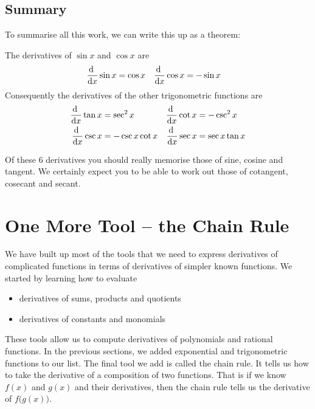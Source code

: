 \goodbreak
\subsection*{Summary}
To summarise all this work, we can write this up as a theorem:
\begin{theorem}\label{thm:DIFFtrigDerivs}
 The derivatives of $\sin x$ and $\cos x$ are
\begin{align*}
  \diff{}{x} \sin x &= \cos x & \diff{}{x} \cos x &= - \sin x
\end{align*}
Consequently the derivatives of the other trigonometric functions are
\begin{align*}
  \diff{}{x} \tan x &= \sec^2 x &
  \diff{}{x} \cot x &= -\csc^2 x \\
  \diff{}{x} \csc x &= -\csc x \cot x &
  \diff{}{x} \sec x &= \sec x \tan x
\end{align*}
\end{theorem}
Of these 6 derivatives you should really memorise those of sine, cosine and tangent. We
certainly expect you to be able to work out those of cotangent, cosecant and secant.


\section{One More Tool  -- the Chain Rule}\label{sec chain rule}

We have built up most of the tools that we need to express derivatives of
complicated functions in terms of derivatives of simpler known functions.
We started by learning how to evaluate
\begin{itemize}
 \item derivatives of sums, products and quotients
 \item derivatives of constants and monomials
\end{itemize}
These tools allow us to compute derivatives of polynomials and
rational functions. In the previous sections, we added exponential and trigonometric
functions to our list. The final tool we add is called the chain rule.
It tells us how to take the derivative of a composition of two functions.
That is if we know $f(x)$ and $g(x)$ and their derivatives, then the chain
rule tells us the derivative of $f\big(g(x)\big)$.

